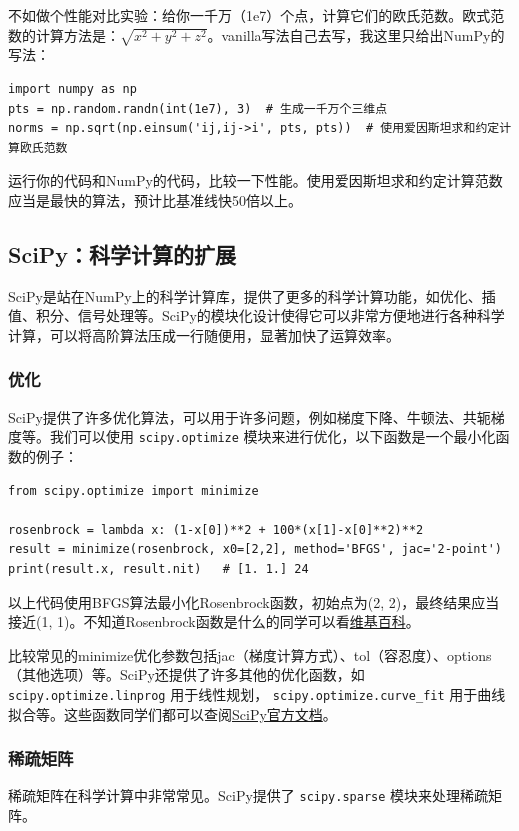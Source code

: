 不如做个性能对比实验：给你一千万（1e7）个点，计算它们的欧氏范数。欧式范数的计算方法是：$\sqrt{x^2 + y^2 + z^2}$。vanilla写法自己去写，我这里只给出NumPy的写法：
\begin{verbatim}
import numpy as np
pts = np.random.randn(int(1e7), 3)  # 生成一千万个三维点
norms = np.sqrt(np.einsum('ij,ij->i', pts, pts))  # 使用爱因斯坦求和约定计算欧氏范数
\end{verbatim}
运行你的代码和NumPy的代码，比较一下性能。使用爱因斯坦求和约定计算范数应当是最快的算法，预计比基准线快50倍以上。

\subsection{SciPy：科学计算的扩展}

SciPy是站在NumPy上的科学计算库，提供了更多的科学计算功能，如优化、插值、积分、信号处理等。SciPy的模块化设计使得它可以非常方便地进行各种科学计算，可以将高阶算法压成一行随便用，显著加快了运算效率。

\subsubsection{优化}
SciPy提供了许多优化算法，可以用于许多问题，例如梯度下降、牛顿法、共轭梯度等。我们可以使用 \texttt{scipy.optimize} 模块来进行优化，以下函数是一个最小化函数的例子：
\begin{verbatim}
from scipy.optimize import minimize

rosenbrock = lambda x: (1-x[0])**2 + 100*(x[1]-x[0]**2)**2
result = minimize(rosenbrock, x0=[2,2], method='BFGS', jac='2-point')
print(result.x, result.nit)   # [1. 1.] 24
\end{verbatim}
以上代码使用BFGS算法最小化Rosenbrock函数，初始点为(2, 2)，最终结果应当接近(1, 1)。不知道Rosenbrock函数是什么的同学可以看\href{https://en.wikipedia.org/wiki/Rosenbrock_function}{维基百科}。

比较常见的minimize优化参数包括jac（梯度计算方式）、tol（容忍度）、options（其他选项）等。SciPy还提供了许多其他的优化函数，如 \texttt{scipy.optimize.linprog} 用于线性规划， \texttt{scipy.optimize.curve\_fit} 用于曲线拟合等。这些函数同学们都可以查阅\href{https://docs.scipy.org/doc/scipy/reference/optimize.html}{SciPy官方文档}。

\subsubsection{稀疏矩阵}

稀疏矩阵在科学计算中非常常见。SciPy提供了 \texttt{scipy.sparse} 模块来处理稀疏矩阵。

